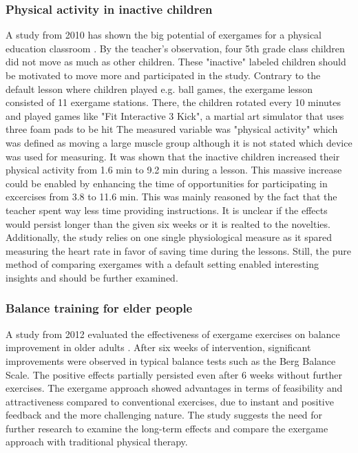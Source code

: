 \subsubsection{Physical activity in inactive children}
A study from 2010 has shown the big potential of exergames for a physical education classroom \cite{fogel2010effects}. By the teacher's observation, four 5th grade class children did not move as much as other children. These "inactive" labeled children should be motivated to move more and participated in the study. 
Contrary to the default lesson where children played e.g. ball games, the exergame lesson consisted of 11 exergame stations. There, the children rotated every 10 minutes and played games like "Fit Interactive 3 Kick", a martial art simulator that uses three foam pads to be hit 
The measured variable was "physical activity" which was defined as moving a large muscle group although it is not stated which device was used for measuring. It was shown that the inactive children increased their physical activity from 1.6 min to 9.2 min during a lesson. This massive increase could be enabled by enhancing the time of opportunities for participating in excercises from 3.8 to 11.6 min. This was mainly reasoned by the fact that the teacher spent way less time providing instructions. 
It is unclear if the effects would persist longer than the given six weeks or it is realted to the novelties. Additionally, the study relies on one single physiological measure as it spared measuring the heart rate in favor of saving time during the lessons. Still, the pure method of comparing exergames with a default setting enabled interesting insights and should be further examined.

\subsubsection{Balance training for elder people}
A study from 2012 evaluated the effectiveness of exergame exercises on balance improvement in older adults \cite{lai2013effects}. After six weeks of intervention, significant improvements were observed in typical balance tests such as the Berg Balance Scale. The positive effects partially persisted even after 6 weeks without further exercises. The exergame approach showed advantages in terms of feasibility and attractiveness compared to conventional exercises, due to instant and positive feedback and the more challenging nature. The study suggests the need for further research to examine the long-term effects and compare the exergame approach with traditional physical therapy.

